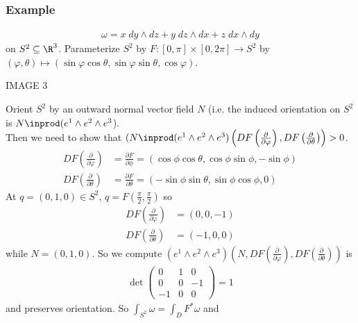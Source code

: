 \documentclass[11pt]{article}
\begin{document}
\subsubsection*{Example}
\label{sec:org35ca9ed}
\begin{align*}
  \omega=x\;dy\wedge dz+y\;dz\wedge dx+z\;dx\wedge dy
\end{align*}
on \(S^{2}\subseteq\R^{3}\). Parameterize \(S^{2}\) by \(F:[0,\pi]\times[0,2\pi]\to S^{2}\) by \((\varphi,\theta)\mapsto(\sin\varphi\cos\theta,\sin\varphi\sin\theta,\cos\varphi)\).\\
\begin{center}
IMAGE 3\\
\end{center}
Orient \(S^{2}\) by an outward normal vector field \(N\) (i.e. the induced orientation on \(S^{2}\) is \(N\inprod(e^{1}\wedge e^{2}\wedge e^{3}\)).\\
Then we need to show that \((N\inprod(e^{1}\wedge e^{2}\wedge e^{3})\left( DF\left( \frac{\partial}{\partial \varphi} \right),DF\left( \frac{\partial}{\partial\theta} \right) \right)>0\).\\
\begin{align*}
  DF\left( \frac{\partial}{\partial\varphi} \right)
  &=\frac{\partial F}{\partial\phi}
  =(\cos\phi\cos\theta,\cos\phi\sin\phi,-\sin\phi) \\
  DF\left( \frac{\partial}{\partial\theta} \right)
  &=\frac{\partial F}{\partial\theta}
  =(-\sin\phi\sin\theta,\sin\phi\cos\phi,0)
\end{align*}
At \(q=(0,1,0)\in S^{2}\), \(q=F\left( \frac{\pi}{2},\frac{\pi}{2} \right)\) so\\
\begin{align*}
  DF\left( \frac{\partial}{\partial\varphi} \right)
  &=(0,0,-1) \\
  DF\left( \frac{\partial}{\partial\theta} \right)
  &=(-1,0,0)
\end{align*}
while \(N=(0,1,0)\). So we compute \((e^{1}\wedge e^{2}\wedge e^{3})\left( N,DF\left( \frac{\partial}{\partial \varphi} \right),DF\left( \frac{\partial}{\partial\theta} \right) \right)\) is\\
\begin{align*}
  \det
  \begin{pmatrix}
    0 & 1 & 0 \\
    0 & 0 & -1 \\
    -1 & 0 & 0
  \end{pmatrix}
  =1
\end{align*}
and preserves orientation. So \(\int_{S^{2}}\omega=\int_{D}F^{*}\omega\) and\\
\end{document}
